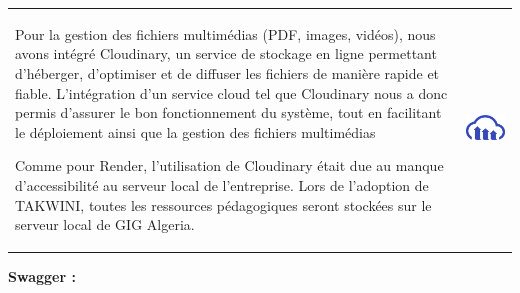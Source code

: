 \documentclass{article}
\begin{document}
\vspace{0,3cm}
\noindent
\begin{tabular}
{@{}m{}@{\hspace{1em}}m{}@{}}
Pour la gestion des fichiers multimédias (PDF, images, vidéos), nous avons intégré Cloudinary, un service de stockage en ligne permettant d’héberger, d’optimiser et de diffuser les fichiers de manière rapide et fiable. L’intégration d’un service cloud tel que Cloudinary nous a donc permis d’assurer le bon fonctionnement du système, tout en facilitant le déploiement ainsi que la gestion des fichiers multimédias
 
Comme pour Render, l’utilisation de Cloudinary était due au manque d’accessibilité au serveur local de l’entreprise. Lors de l’adoption de TAKWINI, toutes les ressources pédagogiques seront stockées sur le serveur local de GIG Algeria.
&
\includegraphics[width=\linewidth]{cloud.png} %
\end{tabular}

\vspace{0,8cm}

\noindent \large \textbf {Swagger \cite{swagger}: }
\end{document}
